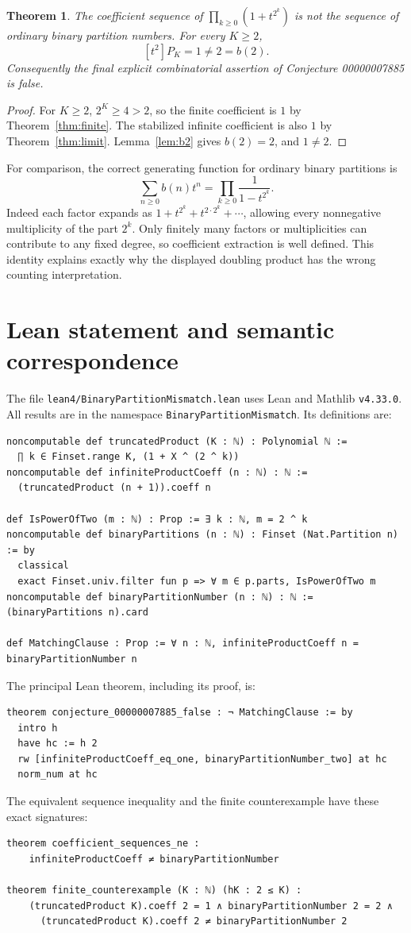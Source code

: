 \documentclass[11pt]{article}
\newtheorem{theorem}{Theorem}
\newcommand{\coeff}[2]{[t^{#1}]#2}
\begin{document}
\begin{theorem}\label{thm:refute}
The coefficient sequence of $\prod_{k\geq0}(1+t^{2^k})$ is not the sequence of ordinary binary partition numbers. For every $K\geq2$,
\[
\coeff{2}{P_K}=1\ne2=b(2).
\]
Consequently the final explicit combinatorial assertion of Conjecture 00000007885 is false.
\end{theorem}
\begin{proof}
For $K\geq2$, $2^K\geq4>2$, so the finite coefficient is $1$ by Theorem~\ref{thm:finite}. The stabilized infinite coefficient is also $1$ by Theorem~\ref{thm:limit}. Lemma~\ref{lem:b2} gives $b(2)=2$, and $1\ne2$.
\end{proof}

For comparison, the correct generating function for ordinary binary partitions is
\[
\sum_{n\geq0}b(n)t^n=\prod_{k\geq0}\frac{1}{1-t^{2^k}}.
\]
Indeed each factor expands as $1+t^{2^k}+t^{2\cdot2^k}+\cdots$, allowing every nonnegative multiplicity of the part $2^k$. Only finitely many factors or multiplicities can contribute to any fixed degree, so coefficient extraction is well defined. This identity explains exactly why the displayed doubling product has the wrong counting interpretation.

\section{Lean statement and semantic correspondence}
The file \texttt{lean4/BinaryPartitionMismatch.lean} uses Lean and Mathlib \texttt{v4.33.0}. All results are in the namespace \texttt{BinaryPartitionMismatch}. Its definitions are:
\begin{lstlisting}
noncomputable def truncatedProduct (K : ℕ) : Polynomial ℕ :=
  ∏ k ∈ Finset.range K, (1 + X ^ (2 ^ k))
noncomputable def infiniteProductCoeff (n : ℕ) : ℕ :=
  (truncatedProduct (n + 1)).coeff n

def IsPowerOfTwo (m : ℕ) : Prop := ∃ k : ℕ, m = 2 ^ k
noncomputable def binaryPartitions (n : ℕ) : Finset (Nat.Partition n) := by
  classical
  exact Finset.univ.filter fun p => ∀ m ∈ p.parts, IsPowerOfTwo m
noncomputable def binaryPartitionNumber (n : ℕ) : ℕ := (binaryPartitions n).card

def MatchingClause : Prop := ∀ n : ℕ, infiniteProductCoeff n = binaryPartitionNumber n
\end{lstlisting}

The principal Lean theorem, including its proof, is:
\begin{lstlisting}
theorem conjecture_00000007885_false : ¬ MatchingClause := by
  intro h
  have hc := h 2
  rw [infiniteProductCoeff_eq_one, binaryPartitionNumber_two] at hc
  norm_num at hc
\end{lstlisting}
The equivalent sequence inequality and the finite counterexample have these exact signatures:
\begin{lstlisting}
theorem coefficient_sequences_ne :
    infiniteProductCoeff ≠ binaryPartitionNumber

theorem finite_counterexample (K : ℕ) (hK : 2 ≤ K) :
    (truncatedProduct K).coeff 2 = 1 ∧ binaryPartitionNumber 2 = 2 ∧
      (truncatedProduct K).coeff 2 ≠ binaryPartitionNumber 2
\end{lstlisting}
\end{document}
